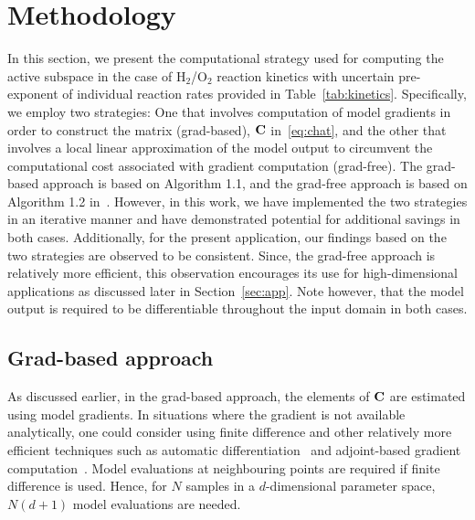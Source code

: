 \section{Methodology}
\label{sec:method}

In this section, we present the computational strategy used for computing the active subspace in the case of
H$_2$/O$_2$ reaction kinetics with uncertain pre-exponent of individual reaction rates provided in
Table~\ref{tab:kinetics}. Specifically, we employ two strategies: One that involves computation of model
gradients in order to construct the matrix (grad-based), $\mathbf{{C}}$ in~\eqref{eq:chat}, and the other that involves a local 
linear approximation of the model output to circumvent the computational cost associated with gradient
computation (grad-free). The grad-based approach is based on Algorithm 1.1, and the grad-free approach is
based on Algorithm 1.2 in~\cite{Constantine:2015}. However, in this work, we have implemented the
two strategies in an iterative manner and have demonstrated potential for additional savings in both cases.
Additionally, for the present application, our findings based on the two strategies are observed to be consistent.
Since, the grad-free approach is relatively more efficient, this observation encourages its use for high-dimensional
applications as discussed later in Section~\ref{sec:app}. Note however, that the model output is required to be
differentiable throughout the input domain in both cases.

\subsection{Grad-based approach}
\label{sub:grad}

As discussed earlier, in the grad-based approach, the elements of $\mathbf{{C}}$ are estimated using model gradients.
 In situations where the gradient is not available analytically, one could consider using
finite difference and other relatively more efficient techniques such as automatic differentiation~\cite{Kiparissides:2009} 
and adjoint-based gradient computation~\cite{Jameson:1988,Gunzburger:2003,Borzi:2011,Alexanderian:2017}.
Model evaluations at neighbouring points are required if finite difference is used. Hence, for 
$N$ samples in a $d$-dimensional parameter space, $N(d+1)$ model evaluations are needed. 

